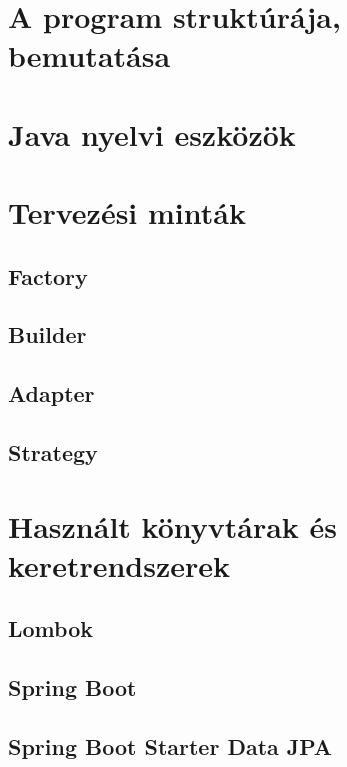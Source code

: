 \section{A program struktúrája, bemutatása}

\section{Java nyelvi eszközök}

\section{Tervezési minták}

\subsection{Factory}

\subsection{Builder}

\subsection{Adapter}

\subsection{Strategy}

\section{Használt könyvtárak és keretrendszerek}

\subsection{Lombok}



\subsection{Spring Boot}

\subsection{Spring Boot Starter Data JPA}

